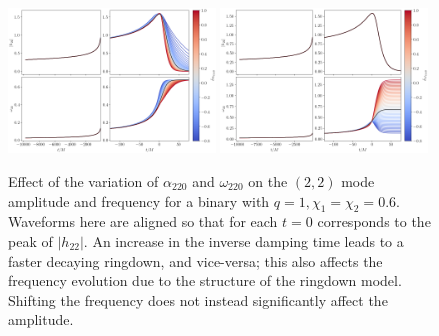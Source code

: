 \documentclass[prd,amssymb,amsmath,amsfonts,nofootinbib,reprint,showpacs,longbibliography]{revtex4-1}
\begin{document}
\begin{figure}
    \includegraphics[width=0.49\textwidth]{figs/delta_alpha220_-0.8_1.0.png}
    \includegraphics[width=0.49\textwidth]{figs/delta_omg220_-0.8_1.0.png}
    \caption{Effect of the variation of $\alpha_{220}$ and $\omega_{220}$ on the $(2,2)$ mode amplitude and frequency
    for a binary with $q = 1, \chi_1 = \chi_2 = 0.6$. Waveforms here are aligned so that for each
    $t = 0$ corresponds to the peak of $|h_{22}|$. An increase in the inverse damping time leads to a faster
    decaying ringdown, and vice-versa; this also affects the frequency evolution due to the structure of the
    ringdown model. Shifting the frequency does not instead significantly affect the amplitude.}
\end{figure}
\end{document}
